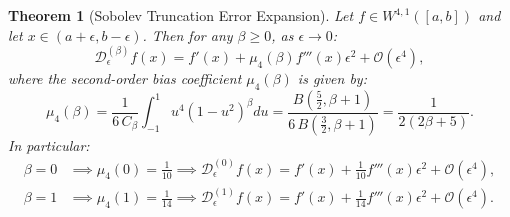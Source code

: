 \documentclass[11pt,a4paper]{article}
\newtheorem{theorem}{Theorem}
\theoremstyle{definition}
\begin{document}
\begin{theorem}[Sobolev Truncation Error Expansion]
\label{thm:truncation_error}
Let $f \in W^{4, 1}([a, b])$ and let $x \in (a+\epsilon, b-\epsilon)$. Then for any $\beta \ge 0$, as $\epsilon \to 0$:
\begin{equation}
\mathcal{D}_\epsilon^{(\beta)} f(x) = f'(x) + \mu_4(\beta) f'''(x) \epsilon^2 + \mathcal{O}(\epsilon^4),
\label{eq:truncation_expansion}
\end{equation}
where the second-order bias coefficient $\mu_4(\beta)$ is given by:
\begin{equation}
\mu_4(\beta) = \frac{1}{6 \, C_\beta} \int_{-1}^{1} u^4 (1 - u^2)^\beta du = \frac{B\left(\frac{5}{2}, \beta + 1\right)}{6 \, B\left(\frac{3}{2}, \beta + 1\right)} = \frac{1}{2(2\beta + 5)}.
\label{eq:mu4_formula}
\end{equation}
In particular:
\begin{align}
\beta = 0 &\implies \mu_4(0) = \frac{1}{10} \implies \mathcal{D}_\epsilon^{(0)} f(x) = f'(x) + \frac{1}{10} f'''(x) \epsilon^2 + \mathcal{O}(\epsilon^4), \\
\beta = 1 &\implies \mu_4(1) = \frac{1}{14} \implies \mathcal{D}_\epsilon^{(1)} f(x) = f'(x) + \frac{1}{14} f'''(x) \epsilon^2 + \mathcal{O}(\epsilon^4).
\end{align}
\end{theorem}
\end{document}
